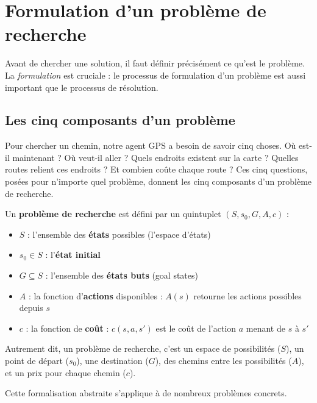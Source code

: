 \documentclass[11pt,a4paper]{article}
\begin{document}
\section{Formulation d'un problème de recherche}

Avant de chercher une solution, il faut définir précisément ce qu'est le problème. La \textit{formulation} est cruciale : le processus de formulation d'un problème est aussi important que le processus de résolution.

\subsection{Les cinq composants d'un problème}

Pour chercher un chemin, notre agent GPS a besoin de savoir cinq choses. Où est-il maintenant ? Où veut-il aller ? Quels endroits existent sur la carte ? Quelles routes relient ces endroits ? Et combien coûte chaque route ? Ces cinq questions, posées pour n'importe quel problème, donnent les cinq composants d'un problème de recherche.

\begin{definitionbox}
Un \textbf{problème de recherche} est défini par un quintuplet $(S, s_0, G, A, c)$ :
\begin{itemize}
    \item $S$ : l'ensemble des \textbf{états} possibles (l'espace d'états)
    \item $s_0 \in S$ : l'\textbf{état initial}
    \item $G \subseteq S$ : l'ensemble des \textbf{états buts} (goal states)
    \item $A$ : la fonction d'\textbf{actions} disponibles : $A(s)$ retourne les actions possibles depuis $s$
    \item $c$ : la fonction de \textbf{coût} : $c(s, a, s')$ est le coût de l'action $a$ menant de $s$ à $s'$
\end{itemize}

Autrement dit, un problème de recherche, c'est un espace de possibilités ($S$), un point de départ ($s_0$), une destination ($G$), des chemins entre les possibilités ($A$), et un prix pour chaque chemin ($c$).
\end{definitionbox}

Cette formalisation abstraite s'applique à de nombreux problèmes concrets.
\end{document}
